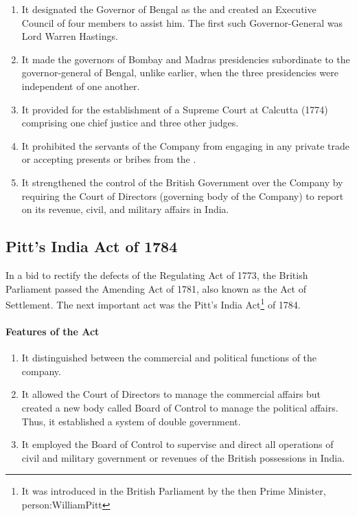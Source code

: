 \begin{enumerate}
  \item It designated the Governor of Bengal as the  and created an Executive Council of four members to assist him. The first such Governor-General was Lord Warren Hastings.
  \item It made the governors of Bombay and Madras presidencies subordinate to the governor-general of Bengal, unlike earlier, when the three presidencies were independent of one another.
  \item It provided for the establishment of a Supreme Court at Calcutta (1774) comprising one chief justice and three other judges.
  \item It prohibited the servants of the Company from engaging in any private trade or accepting presents or bribes from the .
  \item It strengthened the control of the British Government over the Company by requiring the Court of Directors (governing body of the Company) to report on its revenue, civil, and military affairs in India.
\end{enumerate}

\subsection{Pitt's India Act of 1784}

In a bid to rectify the defects of the Regulating Act of 1773, the British Parliament passed the Amending Act of 1781, also known as the Act of Settlement. The next important act was the Pitt's India Act\footnote{It was introduced in the British Parliament by the then Prime Minister, \gls{person:WilliamPitt}} of 1784.

\paragraph{Features of the Act}
\begin{enumerate}
  \item It distinguished between the commercial and political functions of the company.
  \item It allowed the Court of Directors to manage the commercial affairs but created a new body called Board of Control to manage the political affairs. Thus, it established a system of double government.
  \item It employed the Board of Control to supervise and direct all operations of civil and military government or revenues of the British possessions in India.
\end{enumerate}

